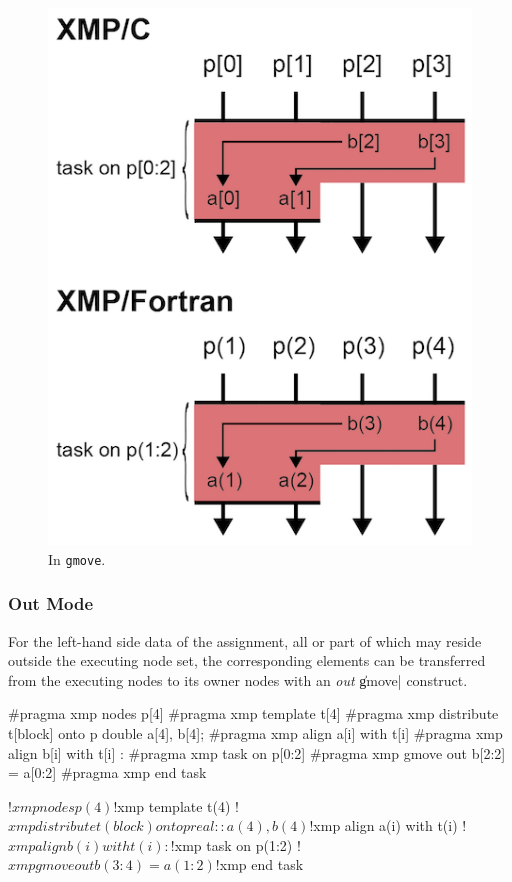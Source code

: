 \begin{figure}
  \centering
  \includegraphics{figs/gmove_in.png}
  \caption{In {\tt gmove}.}
\end{figure}


\subsubsection{Out Mode}

For the left-hand side data of the assignment, all or part of which may
reside outside the executing node set, the corresponding elements can be
transferred from the executing nodes to its owner nodes with an {\it out}
\|gmove| construct.

\begin{XCexample}
#pragma xmp nodes p[4]
#pragma xmp template t[4]
#pragma xmp distribute t[block] onto p
double a[4], b[4];
#pragma xmp align a[i] with t[i]
#pragma xmp align b[i] with t[i]
   :
#pragma xmp task on p[0:2]
#pragma xmp gmove out
  b[2:2] = a[0:2]
#pragma xmp end task
\end{XCexample}

\begin{XFexample}
!$xmp nodes p(4)
!$xmp template t(4)
!$xmp distribute t(block) onto p
real :: a(4), b(4)
!$xmp align a(i) with t(i)
!$xmp align b(i) with t(i)
   :
!$xmp task on p(1:2)
!$xmp gmove out
  b(3:4) = a(1:2)
!$xmp end task
\end{XFexample}

